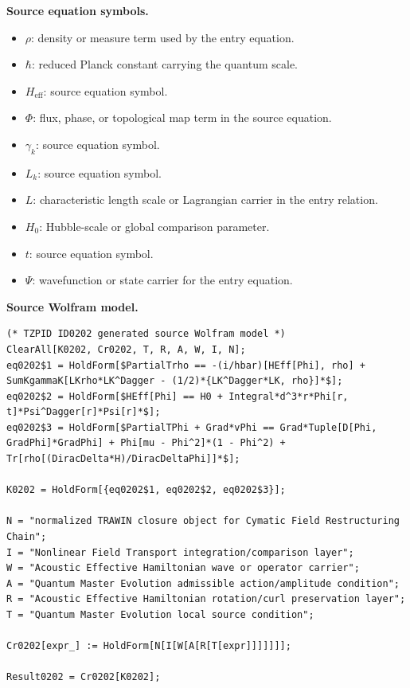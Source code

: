 \begin{minipage}[t]{0.49\linewidth}
\begingroup
\small
\raggedright
\textbf{Source equation symbols.}\par
\begin{itemize}[leftmargin=1.35em,itemsep=1pt,topsep=1pt,parsep=0pt]
    \item $\rho$: density or measure term used by the entry equation.
    \item $\hbar$: reduced Planck constant carrying the quantum scale.
    \item $H_{\mathrm{eff}}$: source equation symbol.
    \item $\Phi$: flux, phase, or topological map term in the source equation.
    \item $\gamma_k$: source equation symbol.
    \item $L_k$: source equation symbol.
    \item $L$: characteristic length scale or Lagrangian carrier in the entry relation.
    \item $H_0$: Hubble-scale or global comparison parameter.
    \item $t$: source equation symbol.
    \item $\Psi$: wavefunction or state carrier for the entry equation.
\end{itemize}
\endgroup
\end{minipage}\hfill
\begin{minipage}[t]{0.47\linewidth}
\begingroup
\scriptsize
\raggedright
\textbf{Source Wolfram model.}\par
\begin{Verbatim}[fontsize=\tiny,breaklines=true,breakanywhere=true]
(* TZPID ID0202 generated source Wolfram model *)
ClearAll[K0202, Cr0202, T, R, A, W, I, N];
eq0202$1 = HoldForm[$PartialTrho == -(i/hbar)[HEff[Phi], rho] + SumKgammaK[LKrho*LK^Dagger - (1/2)*{LK^Dagger*LK, rho}]*$];
eq0202$2 = HoldForm[$HEff[Phi] == H0 + Integral*d^3*r*Phi[r, t]*Psi^Dagger[r]*Psi[r]*$];
eq0202$3 = HoldForm[$PartialTPhi + Grad*vPhi == Grad*Tuple[D[Phi, GradPhi]*GradPhi] + Phi[mu - Phi^2]*(1 - Phi^2) + Tr[rho[(DiracDelta*H)/DiracDeltaPhi]]*$];

K0202 = HoldForm[{eq0202$1, eq0202$2, eq0202$3}];

N = "normalized TRAWIN closure object for Cymatic Field Restructuring Chain";
I = "Nonlinear Field Transport integration/comparison layer";
W = "Acoustic Effective Hamiltonian wave or operator carrier";
A = "Quantum Master Evolution admissible action/amplitude condition";
R = "Acoustic Effective Hamiltonian rotation/curl preservation layer";
T = "Quantum Master Evolution local source condition";

Cr0202[expr_] := HoldForm[N[I[W[A[R[T[expr]]]]]]];

Result0202 = Cr0202[K0202];
\end{Verbatim}
\endgroup
\end{minipage}


